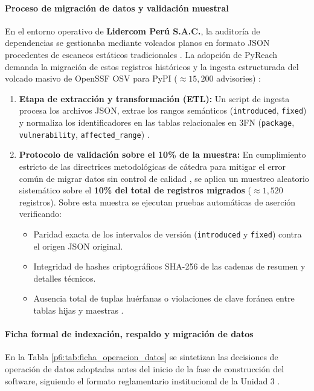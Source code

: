 \paragraph*{Proceso de migración de datos y validación muestral}
En el entorno operativo de \textbf{Lidercom Perú S.A.C.}, la auditoría de dependencias se gestionaba mediante volcados planos en formato JSON procedentes de escaneos estáticos tradicionales \cite{ladisa2023sok, torres2026proyecto}. La adopción de PyReach demanda la migración de estos registros históricos y la ingesta estructurada del volcado masivo de OpenSSF OSV para PyPI ($\approx 15,200$ advisories) \cite{openssf2023osv}:

\begin{enumerate}
    \item \textbf{Etapa de extracción y transformación (ETL):} Un script de ingesta procesa los archivos JSON, extrae los rangos semánticos (\texttt{introduced}, \texttt{fixed}) y normaliza los identificadores en las tablas relacionales en 3FN (\texttt{package}, \texttt{vulnerability}, \texttt{affected\_\allowbreak range}) \cite{torres2026proyecto}.
    \item \textbf{Protocolo de validación sobre el 10\% de la muestra:} En cumplimiento estricto de las directrices metodológicas de cátedra para mitigar el error común de migrar datos sin control de calidad \cite{torres2026proyecto}, se aplica un muestreo aleatorio sistemático sobre el \textbf{10\% del total de registros migrados} ($\approx 1,520$ registros). Sobre esta muestra se ejecutan pruebas automáticas de aserción verificando:
    \begin{itemize}
        \item Paridad exacta de los intervalos de versión (\texttt{introduced} y \texttt{fixed}) contra el origen JSON original.
        \item Integridad de hashes criptográficos SHA-256 de las cadenas de resumen y detalles técnicos.
        \item Ausencia total de tuplas huérfanas o violaciones de clave foránea entre tablas hijas y maestras \cite{torres2026proyecto}.
    \end{itemize}
\end{enumerate}

\paragraph*{Ficha formal de indexación, respaldo y migración de datos}
En la Tabla \ref{p6:tab:ficha_operacion_datos} se sintetizan las decisiones de operación de datos adoptadas antes del inicio de la fase de construcción del software, siguiendo el formato reglamentario institucional de la Unidad 3 \cite{torres2026proyecto}.

